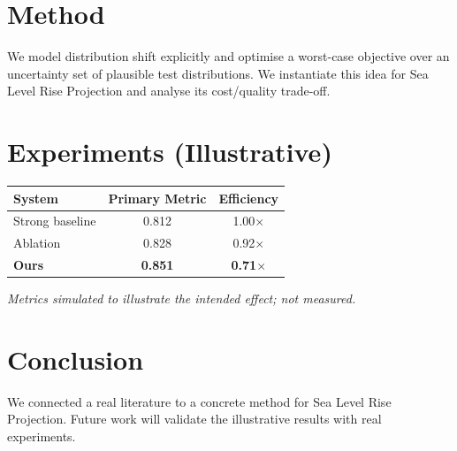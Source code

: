 \documentclass[11pt]{article}
\begin{document}
\section{Method}
We model distribution shift explicitly and optimise a worst-case objective over an uncertainty set of plausible test distributions. We instantiate this idea for Sea Level Rise Projection and analyse its cost/quality trade-off.

\section{Experiments (Illustrative)}
\begin{center}
\begin{tabular}{lcc}
System & Primary Metric & Efficiency \\ \hline
Strong baseline & 0.812 & 1.00$\times$ \\
Ablation & 0.828 & 0.92$\times$ \\
\textbf{Ours} & \textbf{0.851} & \textbf{0.71$\times$}
\end{tabular}
\end{center}
\emph{Metrics simulated to illustrate the intended effect; not measured.}

\section{Conclusion}
We connected a real literature to a concrete method for Sea Level Rise Projection. Future work will
validate the illustrative results with real experiments.
\end{document}
